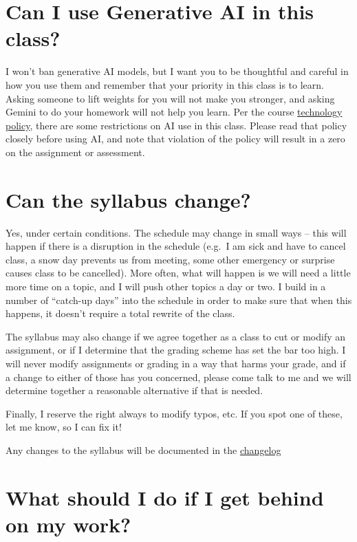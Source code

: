 \documentclass[
  letterpaper,
  DIV=11,
  numbers=noendperiod]{scrartcl}
\begin{document}
\section{Can I use Generative AI in this class?}\label{genAI}

I won't ban generative AI models, but I want you to be thoughtful and
careful in how you use them and remember that your priority in this
class is to learn. Asking someone to lift weights for you will not make
you stronger, and asking Gemini to do your homework will not help you
learn. Per the course \href{syllabus.qmd\#techpolicy}{technology
policy}, there are some restrictions on AI use in this class. Please
read that policy closely before using AI, and note that violation of the
policy will result in a zero on the assignment or assessment.

\section{Can the syllabus change?}\label{changes}

Yes, under certain conditions. The schedule may change in small ways --
this will happen if there is a disruption in the schedule (e.g.~I am
sick and have to cancel class, a snow day prevents us from meeting, some
other emergency or surprise causes class to be cancelled). More often,
what will happen is we will need a little more time on a topic, and I
will push other topics a day or two. I build in a number of ``catch-up
days'' into the schedule in order to make sure that when this happens,
it doesn't require a total rewrite of the class.

The syllabus may also change if we agree together as a class to cut or
modify an assignment, or if I determine that the grading scheme has set
the bar too high. I will never modify assignments or grading in a way
that harms your grade, and if a change to either of those has you
concerned, please come talk to me and we will determine together a
reasonable alternative if that is needed.

Finally, I reserve the right always to modify typos, etc. If you spot
one of these, let me know, so I can fix it!

Any changes to the syllabus will be documented in the
\href{changelog.qmd}{changelog}

\section{What should I do if I get behind on my work?}\label{catchingup}
\end{document}
